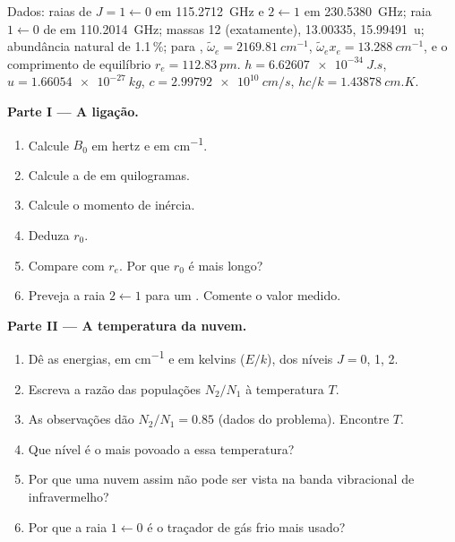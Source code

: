 \begin{problem}
\label{pb:b3:rovibrational-spectroscopy:1}
Dados: raias de  $J = 1 \leftarrow 0$ em \qty{115.2712}{GHz} e $2
\leftarrow 1$ em \qty{230.5380}{GHz}; raia $1 \leftarrow 0$ de  em
\qty{110.2014}{GHz}; massas  12 (exatamente),  13.00335,
 \qty{15.99491}{u}; abundância natural de  1.1\,\%; para ,
$\tilde\omega_e = \qty{2169.81}{cm^{-1}}$, $\tilde\omega_ex_e = \qty{13.288}{cm^{-1}}$, e o
comprimento de equilíbrio $r_e = \qty{112.83}{pm}$. $h = \qty{6.62607e-34}{J.s}$, $u =
\qty{1.66054e-27}{kg}$, $c = \qty{2.99792e10}{cm/s}$, $hc/k = \qty{1.43878}{cm.K}$.

\medskip\noindent\textbf{Parte I --- A ligação.}
\begin{enumerate}
  \item Calcule $B_0$ em hertz e em \unit{cm^{-1}}.
  \item Calcule a  de  em quilogramas.
  \item Calcule o momento de inércia.
  \item Deduza $r_0$.
  \item Compare com $r_e$. Por que $r_0$ é mais longo?
  \item Preveja a raia $2 \leftarrow 1$ para um . Comente o
        valor medido.
\end{enumerate}

\medskip\noindent\textbf{Parte II --- A temperatura da nuvem.}
\begin{enumerate}[resume]
  \item Dê as energias, em \unit{cm^{-1}} e em kelvins ($E/k$), dos níveis $J =
        0$, 1, 2.
  \item Escreva a razão das populações $N_2/N_1$ à temperatura $T$.
  \item As observações dão $N_2/N_1 = 0.85$ (dados do problema). Encontre $T$.
  \item Que nível é o mais povoado a essa temperatura?
  \item Por que uma nuvem assim não pode ser vista na banda vibracional de infravermelho?
  \item Por que a raia $1 \leftarrow 0$ é o traçador de gás frio mais usado?
\end{enumerate}


\end{problem}
